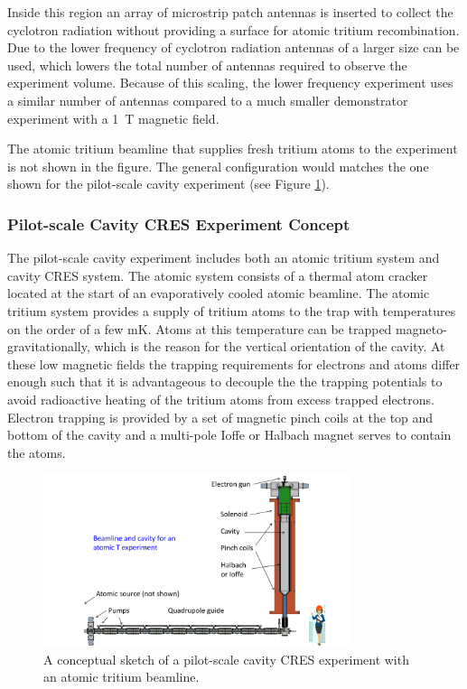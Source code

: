 Inside this region an array of microstrip patch antennas is inserted to collect the cyclotron radiation without providing a surface for atomic tritium recombination. Due to the lower frequency of cyclotron radiation antennas of a larger size can be used, which lowers the total number of antennas required to observe the experiment volume. Because of this scaling, the lower frequency experiment uses a similar number of antennas compared to a much smaller demonstrator experiment with a 1~T magnetic field.

The atomic tritium beamline that supplies fresh tritium atoms to the experiment is not shown in the figure. The general configuration would matches the one shown for the pilot-scale cavity experiment (see Figure \ref{fig:chap3-cavity-pilot-scale}).

\subsubsection*{Pilot-scale Cavity CRES Experiment Concept}

The pilot-scale cavity experiment includes both an atomic tritium system and cavity CRES system. The atomic system consists of a thermal atom cracker located at the start of an evaporatively cooled atomic beamline. The atomic tritium system provides a supply of tritium atoms to the trap with temperatures on the order of a few mK. Atoms at this temperature can be trapped magneto-gravitationally, which is the reason for the vertical orientation of the cavity. At these low magnetic fields the trapping requirements for electrons and atoms differ enough such that it is advantageous to decouple the the trapping potentials to avoid radioactive heating of the tritium atoms from excess trapped electrons. Electron trapping is provided by a set of magnetic pinch coils at the top and bottom of the cavity and a multi-pole Ioffe or Halbach magnet serves to contain the atoms.

\begin{figure}[htbp]
    \centering
    \includegraphics*[width=0.8\textwidth]{figs/Chapter-3/CavityAndBeamAndPerson2.pdf}
    \caption{\label{fig:chap3-cavity-pilot-scale} A conceptual sketch of a pilot-scale cavity CRES experiment with an atomic tritium beamline.}
\end{figure}


